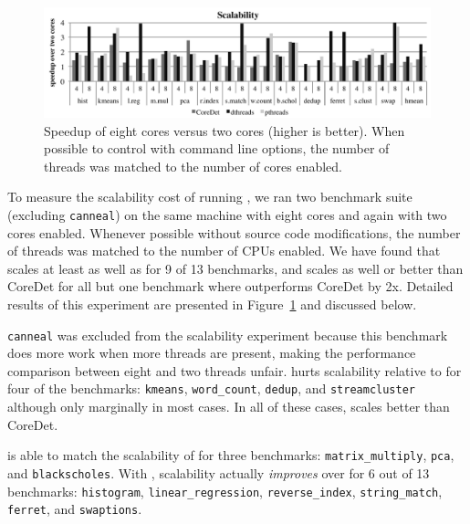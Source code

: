 \label{sec:scalability}

\begin{figure}
{\centering
\includegraphics[width=6in]{dthreads/figure/scalability-figure}
\caption{Speedup of eight cores versus two cores (higher is better).  When possible to control with command line options, the number of threads was matched to the number of cores enabled.\label{fig:scalability}}
}
\end{figure}

To measure the scalability cost of running \dthreads{}, we ran two benchmark suite (excluding \texttt{canneal}) on the same machine with eight cores and again with two cores enabled.  Whenever possible without source code modifications, the number of threads was matched to the number of CPUs enabled.  We have found that \dthreads{} scales at least as well as \pthreads{} for 9 of 13 benchmarks, and scales as well or better than CoreDet for all but one benchmark where \dthreads{} outperforms CoreDet by 2x.  Detailed results of this experiment are presented in Figure~\ref{fig:scalability} and discussed below.

\texttt{canneal} was excluded from the scalability experiment because this benchmark does more work when more threads are present, making the performance comparison between eight and two threads unfair.  \dthreads{} hurts scalability relative to \pthreads{} for four of the benchmarks: \texttt{kmeans}, \texttt{word\_count}, \texttt{dedup}, and \texttt{streamcluster} although only marginally in most cases.  In all of these cases, \dthreads{} scales better than CoreDet.

\dthreads{} is able to match the scalability of \pthreads{} for three benchmarks: \texttt{matrix\_multiply}, \texttt{pca}, and \texttt{blackscholes}.  With \dthreads{}, scalability actually \emph{improves} over \pthreads{} for 6 out of 13 benchmarks: \texttt{histogram}, \texttt{linear\_regression}, \texttt{reverse\_index}, \texttt{string\_match}, \texttt{ferret}, and \texttt{swaptions}.

